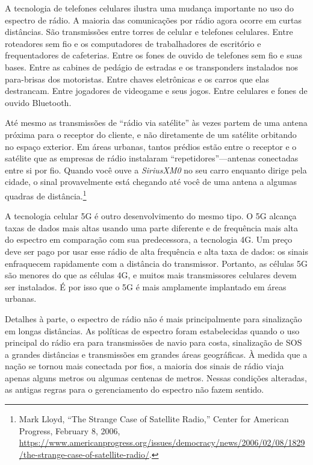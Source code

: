 \documentclass{book}
\newcommand{\ingles}[1]{\textit{#1}}
\begin{document}
A tecnologia de telefones celulares ilustra uma mudança importante no uso do
espectro de rádio. A maioria das comunicações por rádio agora ocorre em curtas
distâncias. São transmissões entre torres de celular e telefones celulares.
Entre roteadores sem fio e os computadores de trabalhadores de escritório e
frequentadores de cafeterias. Entre os fones de ouvido de telefones sem fio e
suas bases. Entre as cabines de pedágio de estradas e os transponders instalados
nos para-brisas dos motoristas. Entre chaves eletrônicas e os carros que elas
destrancam. Entre jogadores de videogame e seus jogos. Entre celulares e fones
de ouvido Bluetooth.

Até mesmo as transmissões de ``rádio via satélite'' às vezes partem de uma antena
próxima para o receptor do cliente, e não diretamente de um satélite orbitando
no espaço exterior. Em áreas urbanas, tantos prédios estão entre o receptor e o
satélite que as empresas de rádio instalaram ``repetidores''---antenas conectadas
entre si por fio. Quando você ouve a \ingles{SiriusXM0} no seu carro enquanto
dirige pela cidade, o sinal provavelmente está chegando até você de uma antena a
algumas quadras de distância.\footnote{Mark Lloyd, ``The Strange Case of Satellite
Radio,'' Center for American Progress, February 8, 2006,
\url{https://www.americanprogress.org/issues/democracy/news/2006/02/08/1829/the-strange-case-of-satellite-radio/}.}

A tecnologia celular 5G é outro desenvolvimento do mesmo tipo. O 5G alcança taxas
de dados mais altas usando uma parte diferente e de frequência mais alta do
espectro em comparação com sua predecessora, a tecnologia 4G. Um preço deve ser
pago por usar esse rádio de alta frequência e alta taxa de dados: os sinais
enfraquecem rapidamente com a distância do transmissor. Portanto, as células 5G
são menores do que as células 4G, e muitos mais transmissores celulares devem ser
instalados. É por isso que o 5G é mais amplamente implantado em áreas urbanas.

Detalhes à parte, o espectro de rádio não é mais principalmente para sinalização
em longas distâncias. As políticas de espectro foram estabelecidas quando o uso
principal do rádio era para transmissões de navio para costa, sinalização de SOS
a grandes distâncias e transmissões em grandes áreas geográficas. À medida que a
nação se tornou mais conectada por fios, a maioria dos sinais de rádio viaja
apenas alguns metros ou algumas centenas de metros. Nessas condições alteradas,
as antigas regras para o gerenciamento do espectro não fazem sentido.
\end{document}
